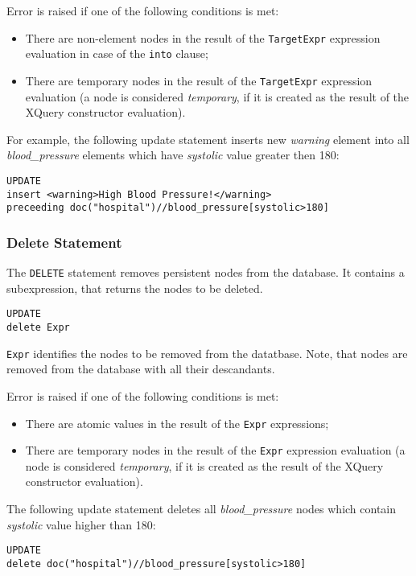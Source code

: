 \documentclass[a4paper,12pt]{article}
\begin{document}
Error is raised if one of the following conditions is met:
\begin{itemize}
\item There are non-element nodes in the result of the \verb!TargetExpr!
expression evaluation in case of the \verb!into! clause;
\item There are temporary nodes in the result of the \verb!TargetExpr!
expression evaluation (a node is considered \emph{temporary}, if it is created
as the result of the XQuery constructor evaluation).
\end{itemize}

For example, the following update statement inserts new \emph{warning} element
into all \emph{blood\_pressure} elements which have \emph{systolic} value
greater then 180:

\begin{verbatim}
UPDATE
insert <warning>High Blood Pressure!</warning>
preceeding doc("hospital")//blood_pressure[systolic>180]
\end{verbatim}


\subsubsection*{Delete Statement}
The \verb!DELETE! statement removes persistent nodes from the database. It
contains a subexpression, that returns the nodes to be deleted.

\begin{verbatim}
UPDATE
delete Expr
\end{verbatim}
\verb!Expr! identifies the nodes to be removed from the datatbase. Note, that
nodes are removed from the database with all their descandants.

Error is raised if one of the following conditions is met:
\begin{itemize}
\item There are atomic values in the result of the \verb!Expr! expressions;
\item There are temporary nodes in the result of the \verb!Expr! expression
evaluation (a node is considered \emph{temporary}, if it is created as the
result of the XQuery constructor evaluation).
\end{itemize}

The following update statement deletes all \emph{blood\_pressure} nodes which
contain \emph{systolic} value higher than 180:

\begin{verbatim}
UPDATE
delete doc("hospital")//blood_pressure[systolic>180]
\end{verbatim}
\end{document}
